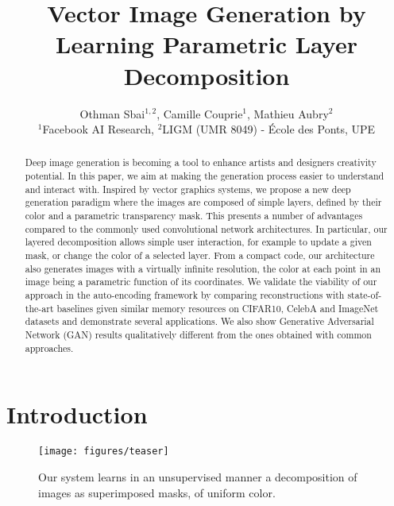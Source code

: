 \documentclass[10pt,twocolumn,letterpaper]{article}
\begin{document}
\title{Vector Image Generation by Learning Parametric Layer Decomposition}

\author{
Othman Sbai$^{1,2}$, Camille Couprie$^1$, Mathieu Aubry$^2$\\
$^1$Facebook AI Research, $^2$LIGM (UMR 8049) - \'Ecole des Ponts, UPE
}

\maketitle

\begin{abstract}
   Deep image generation is becoming a tool to enhance artists and designers creativity potential. In this paper, we aim at making the generation process easier to understand and interact with. Inspired by vector graphics systems, we propose a new deep generation paradigm where the images are composed of simple layers, defined by their color and a parametric transparency mask. This presents a number of advantages compared to the commonly used convolutional network architectures. In particular, our layered decomposition allows simple user interaction, for example to update a given mask, or change the color of a selected layer. From a compact code, our architecture also generates images with a virtually infinite resolution, the color at each point in an image being a parametric function of its coordinates. We validate the viability of our approach in the auto-encoding framework by comparing reconstructions with state-of-the-art baselines given similar memory resources on CIFAR10, CelebA and ImageNet datasets and demonstrate several applications. We also show Generative Adversarial Network (GAN) results qualitatively different from the ones obtained with common approaches.
\end{abstract}


\section{Introduction}

\begin{figure}
    \centering
    \texttt{[image: figures/teaser]}
    \caption{Our system learns in an unsupervised manner a decomposition of images as superimposed masks, of uniform color.}
    \label{fig:my_label}
\end{figure}
\end{document}
